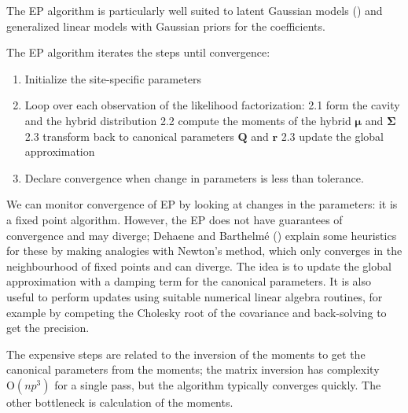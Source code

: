 \documentclass[
  11pt,
  letterpaper,
]{scrbook}
\providecommand{\tightlist}{%
  \setlength{\itemsep}{0pt}\setlength{\parskip}{0pt}}
\theoremstyle{definition}
\theoremstyle{plain}
\theoremstyle{plain}
\theoremstyle{plain}
\theoremstyle{definition}
\theoremstyle{definition}
\theoremstyle{plain}
\theoremstyle{plain}
\theoremstyle{remark}
\begin{document}
The EP algorithm is particularly well suited to latent Gaussian models
() and
generalized linear models with Gaussian priors for the coefficients.

The EP algorithm iterates the steps until convergence:

\begin{enumerate}
\def\labelenumi{\arabic{enumi}.}
\tightlist
\item
  Initialize the site-specific parameters
\item
  Loop over each observation of the likelihood factorization: 2.1 form
  the cavity and the hybrid distribution 2.2 compute the moments of the
  hybrid \(\boldsymbol{\mu}\) and \(\boldsymbol{\Sigma}\) 2.3 transform
  back to canonical parameters \(\mathbf{Q}\) and \(\boldsymbol{r}\) 2.3
  update the global approximation
\item
  Declare convergence when change in parameters is less than tolerance.
\end{enumerate}

We can monitor convergence of EP by looking at changes in the
parameters: it is a fixed point algorithm. However, the EP does not have
guarantees of convergence and may diverge; Dehaene and Barthelmé
() explain some heuristics
for these by making analogies with Newton's method, which only converges
in the neighbourhood of fixed points and can diverge. The idea is to
update the global approximation with a damping term for the canonical
parameters. It is also useful to perform updates using suitable
numerical linear algebra routines, for example by competing the Cholesky
root of the covariance and back-solving to get the precision.

The expensive steps are related to the inversion of the moments to get
the canonical parameters from the moments; the matrix inversion has
complexity \(\mathrm{O}(np^3)\) for a single pass, but the algorithm
typically converges quickly. The other bottleneck is calculation of the
moments.
\end{document}
